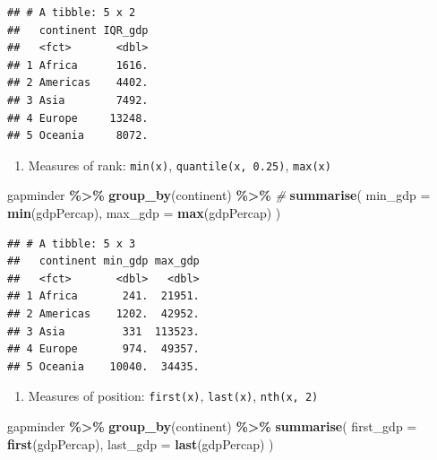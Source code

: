 \documentclass[
]{book}
\newenvironment{Shaded}{\begin{snugshade}}{\end{snugshade}}
\newcommand{\AttributeTok}[1]{\textcolor[rgb]{0.13,0.29,0.53}{#1}}
\newcommand{\CommentTok}[1]{\textcolor[rgb]{0.56,0.35,0.01}{\textit{#1}}}
\newcommand{\FunctionTok}[1]{\textcolor[rgb]{0.13,0.29,0.53}{\textbf{#1}}}
\newcommand{\NormalTok}[1]{#1}
\newcommand{\SpecialCharTok}[1]{\textcolor[rgb]{0.81,0.36,0.00}{\textbf{#1}}}
\providecommand{\tightlist}{%
  \setlength{\itemsep}{0pt}\setlength{\parskip}{0pt}}
\begin{document}
\begin{verbatim}
## # A tibble: 5 x 2
##   continent IQR_gdp
##   <fct>       <dbl>
## 1 Africa      1616.
## 2 Americas    4402.
## 3 Asia        7492.
## 4 Europe     13248.
## 5 Oceania     8072.
\end{verbatim}

\begin{enumerate}
\def\labelenumi{\arabic{enumi}.}
\setcounter{enumi}{1}
\tightlist
\item
  Measures of rank: \texttt{min(x)}, \texttt{quantile(x,\ 0.25)}, \texttt{max(x)}
\end{enumerate}

\begin{Shaded}
\begin{Highlighting}[]
\NormalTok{gapminder }\SpecialCharTok{\%\textgreater{}\%}
  \FunctionTok{group\_by}\NormalTok{(continent) }\SpecialCharTok{\%\textgreater{}\%} \CommentTok{\#}
  \FunctionTok{summarise}\NormalTok{(}
    \AttributeTok{min\_gdp =} \FunctionTok{min}\NormalTok{(gdpPercap),}
    \AttributeTok{max\_gdp =} \FunctionTok{max}\NormalTok{(gdpPercap)}
\NormalTok{  )}
\end{Highlighting}
\end{Shaded}

\begin{verbatim}
## # A tibble: 5 x 3
##   continent min_gdp max_gdp
##   <fct>       <dbl>   <dbl>
## 1 Africa       241.  21951.
## 2 Americas    1202.  42952.
## 3 Asia         331  113523.
## 4 Europe       974.  49357.
## 5 Oceania    10040.  34435.
\end{verbatim}

\begin{enumerate}
\def\labelenumi{\arabic{enumi}.}
\setcounter{enumi}{2}
\tightlist
\item
  Measures of position: \texttt{first(x)}, \texttt{last(x)}, \texttt{nth(x,\ 2)}
\end{enumerate}

\begin{Shaded}
\begin{Highlighting}[]
\NormalTok{gapminder }\SpecialCharTok{\%\textgreater{}\%}
  \FunctionTok{group\_by}\NormalTok{(continent) }\SpecialCharTok{\%\textgreater{}\%}
  \FunctionTok{summarise}\NormalTok{(}
    \AttributeTok{first\_gdp =} \FunctionTok{first}\NormalTok{(gdpPercap),}
    \AttributeTok{last\_gdp =} \FunctionTok{last}\NormalTok{(gdpPercap)}
\NormalTok{  )}
\end{Highlighting}
\end{Shaded}
\end{document}
